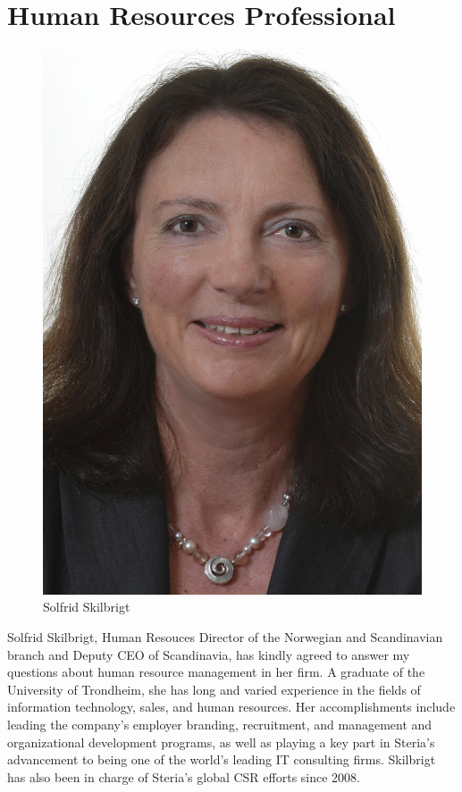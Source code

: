 \documentclass[letterpaper, 12pt]{report}
\begin{document}
\section{Human Resources Professional}
\begin{figure}
	\centering
	\includegraphics[width=\textwidth]{solfrid}
	\caption*{Solfrid Skilbrigt}
\end{figure}
Solfrid Skilbrigt, Human Resouces Director of the Norwegian and Scandinavian branch and Deputy CEO of Scandinavia, has kindly agreed to answer my questions about human resource management in her firm. 
A graduate of the University of Trondheim, she has long and varied experience in the fields of information technology, sales, and human resources.
Her accomplishments include leading the company's employer branding, recruitment, and management and organizational development programs, as well as playing a key part in Steria's advancement to being one of the world's leading IT consulting firms. 
Skilbrigt has also been in charge of Steria's global CSR efforts since 2008.
\end{document}
